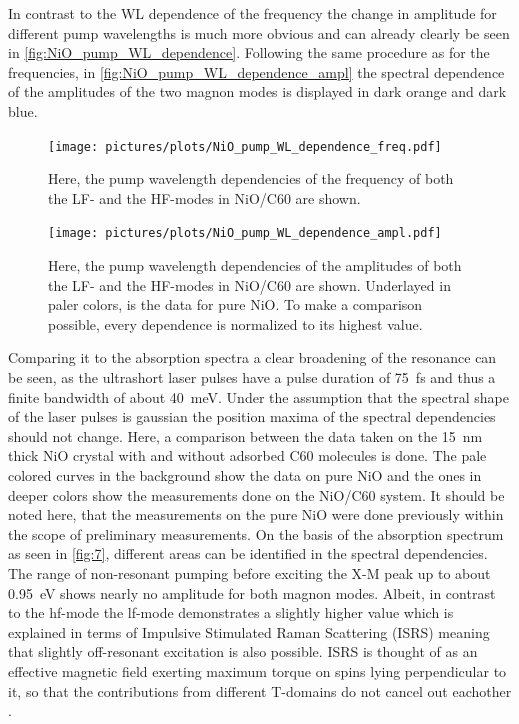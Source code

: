 \FloatBarrier
In contrast to the WL dependence of the frequency the change in amplitude for different pump wavelengths is much more obvious and can already clearly be seen in \autoref{fig:NiO_pump_WL_dependence}.
Following the same procedure as for the frequencies, in \autoref{fig:NiO_pump_WL_dependence_ampl} the spectral dependence of the amplitudes of the two magnon modes is displayed in dark orange and dark blue.
\begin{figure}[ht]
    \centering
    \texttt{[image: pictures/plots/NiO\_pump\_WL\_dependence\_freq.pdf]}
    \caption{Here, the pump wavelength dependencies of the frequency of both the LF- and the HF-modes in NiO/C60 are shown.}
    \label{fig:NiO_pump_WL_dependence_freq}
\end{figure}
\begin{figure}[ht]
    \centering
    \texttt{[image: pictures/plots/NiO\_pump\_WL\_dependence\_ampl.pdf]}
    \caption{Here, the pump wavelength dependencies of the amplitudes of both the LF- and the HF-modes in NiO/C60 are shown. Underlayed in paler colors, is the data for pure NiO. To make a comparison possible, every dependence is normalized to its highest value.}
    \label{fig:NiO_pump_WL_dependence_ampl}
\end{figure}
\FloatBarrier
Comparing it to the absorption spectra a clear broadening of the resonance can be seen, as the ultrashort laser pulses have a pulse duration of \qty{75}{fs} and thus a finite bandwidth of about \qty{40}{meV}.
Under the assumption that the spectral shape of the laser pulses is gaussian the position maxima of the spectral dependencies should not change.
Here, a comparison between the data taken on the \qty{15}{nm} thick NiO crystal with and without adsorbed C60 molecules is done.
The pale colored curves in the background show the data on pure NiO and the ones in deeper colors show the measurements done on the NiO/C60 system.
It should be noted here, that the measurements on the pure NiO were done previously within the scope of preliminary measurements.
On the basis of the absorption spectrum as seen in \autoref{fig:7}, different areas can be identified in the spectral dependencies.
The range of non-resonant pumping before exciting the X-M peak up to about \qty{0.95}{eV} shows nearly no amplitude for both magnon modes.
Albeit, in contrast to the hf-mode the lf-mode demonstrates a slightly higher value which is explained in terms of Impulsive Stimulated Raman Scattering (ISRS)  meaning that slightly off-resonant excitation is also possible.
ISRS is thought of as an effective magnetic field exerting maximum torque on spins lying perpendicular to it, so that the contributions from different T-domains do not cancel out eachother .
